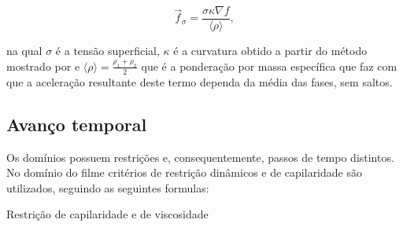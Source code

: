 \begin{equation}
    \vec{f}_{\sigma} = \frac{\sigma \kappa \nabla f}{\langle \rho \rangle},
    \label{eq:csf}
\end{equation}

na qual $\sigma$ é a tensão superficial, $\kappa$ é a curvatura obtido a partir do método mostrado por \citet{Shirani2004} e ${\langle \rho \rangle = \frac{\rho_1 + \rho_2}{2}}$ que é a ponderação por massa específica que faz com que a aceleração resultante deste termo dependa da média das fases, sem saltos.


\subsection{Avanço temporal}

Os domínios possuem restrições e, consequentemente, passos de tempo distintos. No domínio do filme critérios de restrição dinâmicos e de capilaridade são utilizados, seguindo as seguintes formulas:

Restrição de capilaridade e de viscosidade
